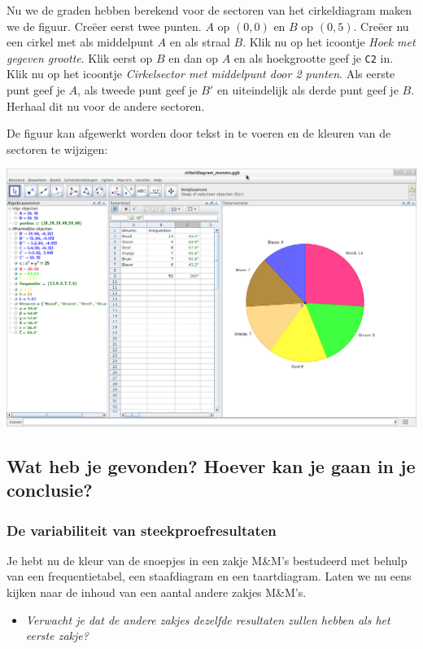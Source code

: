 \documentclass[11pt]{article}
\newcommand{\vraag}[2]{\begin{itemize}\item {\it #1} \vspace*{#2}\end{itemize}}
\begin{document}
Nu we de graden hebben berekend voor de sectoren van het cirkeldiagram maken we de figuur. Creëer eerst twee punten. $A$ op $(0,0)$ en $B$ op $(0,5)$. Creëer nu een cirkel met als middelpunt $A$ en als straal $B$. Klik nu op het icoontje {\it Hoek met gegeven grootte}. Klik eerst op $B$ en dan op $A$ en als hoekgrootte geef je \verb$C2$ in. Klik nu op het icoontje {\it Cirkelsector met middelpunt door 2 punten}. Als eerste punt geef je $A$, als tweede punt geef je $B'$ en uiteindelijk als derde punt geef je $B$. Herhaal dit nu voor de andere sectoren.

De figuur kan afgewerkt worden door tekst in te voeren en de kleuren van de sectoren te wijzigen:
\begin{center}
  \includegraphics[width=14cm]{gg-cirkeldiagram_menms}
\end{center}

\subsection{Wat heb je gevonden? Hoever kan je gaan in je conclusie?}

\subsubsection{De variabiliteit van steekproefresultaten}

Je hebt nu de kleur van de snoepjes in een zakje M\&M’s bestudeerd met behulp van een
frequentietabel, een staafdiagram en een taartdiagram. Laten we nu eens kijken naar de
inhoud van een aantal andere zakjes M\&M's.

\vraag{Verwacht je dat de andere zakjes dezelfde resultaten zullen hebben als het eerste zakje?}{3cm}
\end{document}
